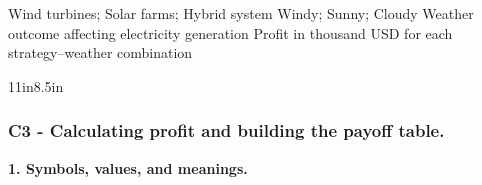 	\DecisionElementsTable
	{Wind turbines; Solar farms; Hybrid system}
	{Windy; Sunny; Cloudy}
	{Weather outcome affecting electricity generation}
	{Profit in thousand USD for each strategy--weather combination}


	\begin{CalculationLandscape}{11in}{8.5in}
\subsubsection*{C3 - Calculating profit and building the payoff table.}
	\label{subsec:problem4-green-energy-production-mix-c3}

\textbf{1. Symbols, values, and meanings.}


\end{CalculationLandscape}
